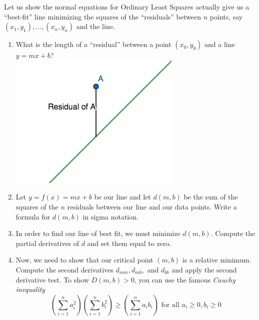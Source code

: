 \documentclass[12pt, a4paper]{article}
\begin{document}
\begin{ex}
  Let us show the normal equations for Ordinary Least Squares actually
  give us a ``best-fit'' line minimizing the squares of the
  ``residuals'' between 
  \(n\) points, say \((x_1,y_1), \ldots, (x_n, y_n)\) and the line.
  \begin{enumerate}
  \item What is the length of a ``residual'' between a point
    \((x_0,y_0)\) and a line 
    \(y=mx+b\)?\\
    \includegraphics[scale=0.5]{images/residual}
  \item Let \(y = f(x) = mx+b\) be our line and let \(d(m,b)\) be the
    sum of the squares of the \(n\) residuals between our line and our data
    points. Write a formula for \(d(m,b)\) in sigma notation.
    \vspace{1in}
  \item In order to find our line of best fit, we must minimize
    \(d(m,b)\). Compute the partial derivatives of \(d\) and set them
    equal to zero.
    \vspace{2in}
  \item Now, we need to show that our critical point \((m,b)\) is a relative
    minimum. Compute the second derivatives \(d_{mm}, d_{mb},\) and
    \(d_{bb}\) and apply the second derivative test. To show \(D(m,b)
    >0\), you can use the
    famous \emph{Cauchy inequality} \[
      \left( \sum_{i=1}^n a_i^2 \right) \left( \sum_{i=1}^n b_i^2 \right) \geq
      \left( \sum_{i=1}^n a_i b_i \right) \text{ for all } a_i \geq 0, b_i
      \geq 0
    \]
  \end{enumerate}
\end{ex}
\end{document}
